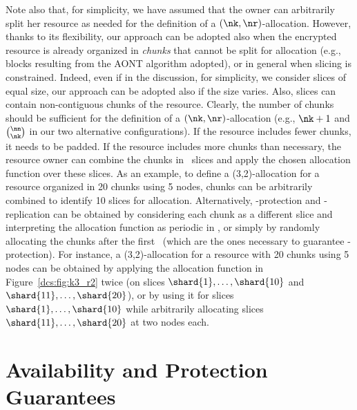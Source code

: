 {Note also that, for simplicity, we have assumed that the owner can
arbitrarily split her resource as needed for the definition of a
$(\nk,\nr)$-allocation. However, thanks to its flexibility, our
approach can be adopted also when the encrypted resource is already
organized in {\em chunks} that cannot be split for allocation (e.g.,
blocks resulting from the AONT algorithm adopted), or in general when
slicing is constrained. Indeed, even if in the discussion, for
simplicity, we consider slices of equal size, our approach can be
adopted also if the size varies.  Also, slices can contain
non-contiguous chunks of the resource. Clearly, the number of chunks
should be sufficient for the definition of a $(\nk,\nr)$-allocation
(e.g., $\nk+1$ and $\binom{\nn}{\nk}$ in our two alternative
configurations). If the resource includes fewer chunks, it needs to be
padded. If the resource includes more chunks than necessary, the
resource owner can combine the chunks in \ns\ slices and apply the
chosen allocation function over these slices. As an example, to define
a (3,2)-allocation for a resource organized in 20 chunks using 5
nodes, chunks can be arbitrarily combined to identify 10 slices for
allocation. Alternatively, \nk-protection and \nr-replication can be
obtained by considering each chunk as a different slice and
interpreting the allocation function as periodic in \ns, or simply by
randomly allocating the chunks after the first \ns\ (which are the
ones necessary to guarantee \nk-protection). For instance, a
(3,2)-allocation for a resource with 20 chunks using 5 nodes can be
obtained by applying the allocation function in Figure~\ref{dcs:fig:k3_r2}
twice (on slices $\shard{1},\ldots,\shard{10}$ and
$\shard{11},\ldots,\shard{20}$), or by using it for slices
$\shard{1},\ldots,\shard{10}$ while arbitrarily allocating slices
$\shard{11},\ldots,\shard{20}$ at two nodes each.


\section[Guarantees]{Availability and Protection Guarantees}\label{dcs:sec:analysis}

}
